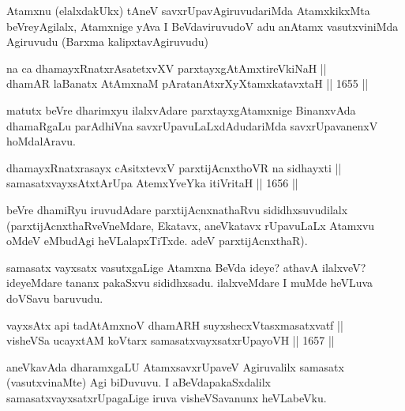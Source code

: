\begin{artha}
Atamxnu (elalxdakUkx) tAneV savxrUpavAgiruvudariMda AtamxkikxMta beVreyAgilalx, Atamxnige yAva I BeVdaviruvudoV adu anAtamx vasutxviniMda Agiruvudu (Barxma kalipxtavAgiruvudu)
\end{artha}

\begin{shl}
na ca dhamayxRnatxrAsatetxvXV parxtayxgAtAmxtireVkiNaH ||  \\
dhamAR laBanatx AtAmxnaM pAratanAtxrXyXtamxkatavxtaH \hfill || 1655 ||  
\end{shl}

\begin{artha}
matutx beVre dharimxyu ilalxvAdare parxtayxgAtamxnige BinanxvAda dhamaRgaLu parAdhiVna savxrUpavuLaLxdAdudariMda savxrUpavanenxV hoMdalAravu.
\end{artha}

\begin{shl}
dhamayxRnatxrasayx cAsitxtevxV parxtijAcnxthoVR na sidhayxti || \\
samasatxvayxsAtxtArUpa AtemxYveYka itiVritaH \hfill || 1656 ||  
\end{shl}

\begin{artha}
beVre dhamiRyu iruvudAdare parxtijAcnxnathaRvu sididhxsuvudilalx (parxtijAcnxthaRveVneMdare, Ekatavx, aneVkatavx rUpavuLaLx Atamxvu oMdeV eMbudAgi heVLalapxTiTxde. adeV parxtijAcnxthaR).
\end{artha}

\begin{artha}
samasatx vayxsatx vasutxgaLige Atamxna BeVda ideye? athavA ilalxveV? ideyeMdare tananx pakaSxvu sididhxsadu. ilalxveMdare I muMde heVLuva doVSavu baruvudu.
\end{artha}

\begin{shl}
vayxsAtx api tadAtAmxnoV dhamARH suyxshecxVtasxmasatxvatf || \\
visheVSa ucayxtAM koV\s tarx samasatxvayxsatxrUpayoVH \hfill || 1657 ||  
\end{shl}

\begin{artha}
aneVkavAda dharamxgaLU AtamxsavxrUpaveV Agiruvalilx samasatx (vasutxvinaMte) Agi biDuvuvu. I aBeVdapakaSxdalilx samasatxvayxsatxrUpagaLige iruva visheVSavanunx heVLabeVku.
\end{artha}


